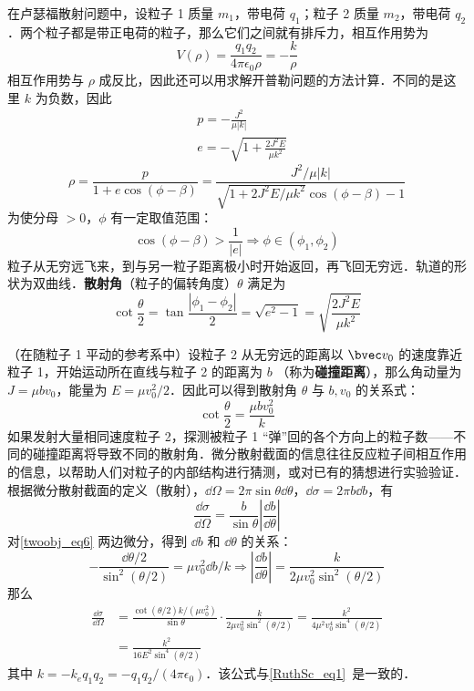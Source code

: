 在卢瑟福散射问题中，设粒子 1 质量 $m_1$，带电荷 $q_1$；粒子 2 质量 $m_2$，带电荷 $q_2$．两个粒子都是带正电荷的粒子，那么它们之间就有排斥力，相互作用势为
\begin{equation}
V(\rho)=\frac{q_1q_2}{4\pi\epsilon_0\rho}=-\frac{k}{\rho}
\end{equation}
相互作用势与 $\rho$ 成反比，因此还可以用求解开普勒问题的方法计算．不同的是这里 $k$ 为负数，因此
\begin{equation}
\begin{aligned}
&p=-\frac{J^2}{\mu |k|}\\
&e=-\sqrt{1+\frac{2J^2E}{\mu k^2}}
\end{aligned}
\end{equation}
\begin{equation}
\rho=\frac{p}{1+e\cos(\phi-\beta)}=\frac{J^2/\mu |k|}{\sqrt{1+2J^2E/\mu k^2}\cos(\phi-\beta)-1}
\end{equation}
为使分母 $>0$，$\phi$ 有一定取值范围：
\begin{equation}
\cos(\phi-\beta)>\frac{1}{|e|}
\Rightarrow \phi \in (\phi_1,\phi_2)
\end{equation}
粒子从无穷远飞来，到与另一粒子距离极小时开始返回，再飞回无穷远．轨道的形状为双曲线．\textbf{散射角}（粒子的偏转角度）$\theta$ 满足为
\begin{equation}
\cot\frac{\theta}{2}=\tan\frac{|\phi_1-\phi_2|}{2} =\sqrt{e^2-1}=\sqrt{\frac{2J^2E}{\mu k^2}}
\end{equation}

（在随粒子 1 平动的参考系中）设粒子 2 从无穷远的距离以 $\bvec v_0$ 的速度靠近粒子 1，开始运动所在直线与粒子 2 的距离为 $b$ （称为\textbf{碰撞距离}），那么角动量为 $J=\mu bv_0$，能量为 $E=\mu v_0^2/2$．因此可以得到散射角 $\theta$ 与 $b,v_0$ 的关系式：
\begin{equation}\label{twoobj_eq6}
\cot \frac{\theta}{2}=\frac{\mu bv_0^2}{k}
\end{equation}
如果发射大量相同速度粒子 2，探测被粒子 1 “弹”回的各个方向上的粒子数——不同的碰撞距离将导致不同的散射角．微分散射截面的信息往往反应粒子间相互作用的信息，以帮助人们对粒子的内部结构进行猜测，或对已有的猜想进行实验验证．根据微分散射截面的定义（散射），$\dd \Omega=2\pi \sin\theta \dd \theta$，$\dd \sigma=2\pi b\dd b$，有
\begin{equation}
\frac{\dd \sigma}{\dd \Omega}=\frac{b}{\sin \theta}\left|\frac{\dd b}{\dd \theta}\right|
\end{equation}
对\autoref{twoobj_eq6} 两边微分，得到 $\dd b$ 和 $\dd \theta$ 的关系：
\begin{equation}
-\frac{\dd \theta/2}{\sin^2(\theta/2)}=\mu v_0^2\dd b/k\Rightarrow \left|\frac{\dd b}{\dd \theta}\right|=\frac{k}{2\mu v_0^2\sin^2(\theta/2)}
\end{equation}
那么
\begin{equation}
\begin{aligned}
\frac{\dd \sigma}{\dd \Omega}&=\frac{\cot(\theta/2)k/(\mu v_0^2)}{\sin\theta}\cdot \frac{k}{2\mu v_0^2\sin^2(\theta/2)}=\frac{k^2}{4\mu ^2v_0^4\sin^4(\theta/2)}
\\
&=\frac{k^2}{16E^2\sin^4(\theta/2)}
\end{aligned}
\end{equation}
其中 $k=-k_eq_1q_2=-q_1q_2/(4\pi\epsilon_0)$．该公式与\autoref{RuthSc_eq1}~是一致的．